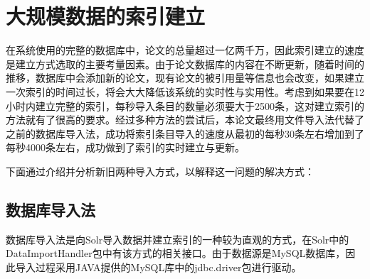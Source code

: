 
\chapter{大规模数据的索引建立}
\label{chap:c3}

在系统使用的完整的数据库中，论文的总量超过一亿两千万，因此索引建立的速度是建立方式选取的主要考量因素。由于论文数据库的内容在不断更新，随着时间的推移，数据库中会添加新的论文，现有论文的被引用量等信息也会改变，如果建立一次索引的时间过长，将会大大降低该系统的实时性与实用性。考虑到如果要在12小时内建立完整的索引，每秒导入条目的数量必须要大于2500条，这对建立索引的方法就有了很高的要求。经过多种方法的尝试后，本论文最终用文件导入法代替了之前的数据库导入法，成功将索引条目导入的速度从最初的每秒30条左右增加到了每秒4000条左右，成功做到了索引的实时建立与更新。

下面通过介绍并分析新旧两种导入方式，以解释这一问题的解决方式：
\section{数据库导入法}
数据库导入法是向Solr导入数据并建立索引的一种较为直观的方式，在Solr中的DataImportHandler包中有该方式的相关接口。由于数据源是MySQL数据库，因此导入过程采用JAVA提供的MySQL库中的jdbc.driver包进行驱动。

